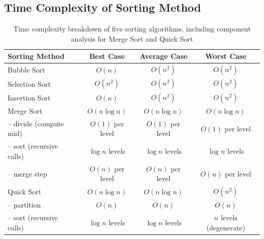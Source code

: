 \documentclass[letterpaper,12pt]{article}
\begin{document}
\subsection{Time Complexity of Sorting Method}
\begin{table}[h!]
\centering
\renewcommand{\arraystretch}{1.3}
\begin{tabular}{|l|c|c|c|}
\hline
\textbf{Sorting Method} & \textbf{Best Case} & \textbf{Average Case} & \textbf{Worst Case} \\
\hline
Bubble Sort      & $O(n)$           & $O(n^2)$         & $O(n^2)$         \\
Selection Sort   & $O(n^2)$         & $O(n^2)$         & $O(n^2)$         \\
Insertion Sort   & $O(n)$           & $O(n^2)$         & $O(n^2)$         \\
\hline
Merge Sort       & $O(n \log n)$    & $O(n \log n)$    & $O(n \log n)$    \\
\quad -- divide (compute mid) & $O(1)$ per level & $O(1)$ per level & $O(1)$ per level \\
\quad -- sort (recursive calls) & $\log n$ levels & $\log n$ levels & $\log n$ levels \\
\quad -- merge step & $O(n)$ per level & $O(n)$ per level & $O(n)$ per level \\
\hline
Quick Sort       & $O(n \log n)$    & $O(n \log n)$    & $O(n^2)$         \\
\quad -- partition & $O(n)$         & $O(n)$           & $O(n)$           \\
\quad -- sort (recursive calls) & $\log n$ levels & $\log n$ levels & $n$ levels (degenerate) \\
\hline
\end{tabular}
\caption{Time complexity breakdown of five sorting algorithms, including component analysis for Merge Sort and Quick Sort}
\end{table}
\end{document}
